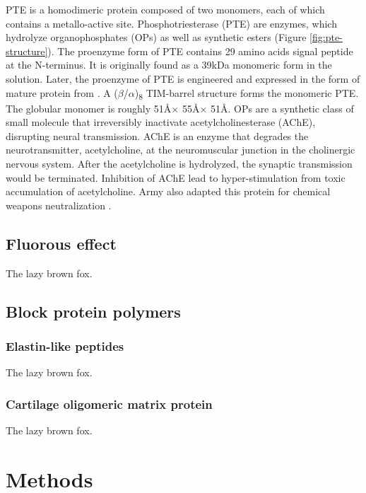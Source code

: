 \begin{refsection}
PTE is a homodimeric protein composed of two monomers, each of which contains a
metallo-active site. Phosphotriesterase (PTE) are enzymes, which hydrolyze
organophosphates (OPs) as well as synthetic esters (Figure
\ref{fig:pte-structure})\cite{Ghanem2005a}. The proenzyme form of PTE contains
29 amino acids signal peptide at the N-terminus. It is originally found as a
39kDa monomeric form in the solution\cite{Mulbry1989}. Later, the proenzyme of
PTE is engineered and expressed in the form of mature protein from . A ($\beta$/$\alpha$)\textsubscript{8} TIM-barrel structure forms the
monomeric PTE\cite{Roodveldt2005,Seibert2005}. The globular monomer is roughly
51\AA $\times$ 55\AA $\times$ 51\AA.  OPs are a synthetic class of small molecule
that irreversibly inactivate acetylcholinesterase (AChE), disrupting
neural transmission. AChE is an enzyme that degrades the neurotransmitter,
acetylcholine, at the neuromuscular junction in the cholinergic nervous system.
After the acetylcholine is hydrolyzed, the synaptic transmission would be
terminated. Inhibition of AChE lead to hyper-stimulation from toxic
accumulation of acetylcholine\cite{Soreq2001}. Army also adapted this protein
for chemical weapons neutralization \cite{Yang2014a}.

\subsection{Fluorous effect}

The lazy brown fox.

\subsection{Block protein polymers}

\subsubsection{Elastin-like peptides}
The lazy brown fox.

\subsubsection{Cartilage oligomeric matrix protein}

The lazy brown fox.

\section{Methods}


\end{refsection}
